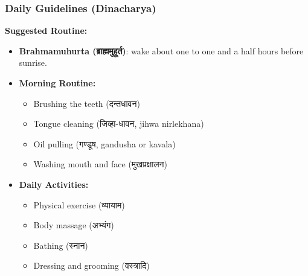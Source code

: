 \begin{frame}[fragile]\frametitle{Daily Guidelines (Dinacharya)}
    \textbf{Suggested Routine:}
    \begin{itemize}
        \item \textbf{Brahmamuhurta (ब्राह्ममुहूर्त)}: wake about one to one and a half hours before sunrise.
        \item \textbf{Morning Routine:}
        \begin{itemize}
            \item Brushing the teeth (दन्तधावन)
            \item Tongue cleaning (जिव्हा-धावन, jihwa nirlekhana)
            \item Oil pulling (गण्डूष, gandusha or kavala)
            \item Washing mouth and face (मुखप्रक्षालन)
        \end{itemize}
        \item \textbf{Daily Activities:}
        \begin{itemize}
            \item Physical exercise (व्यायाम)
            \item Body massage (अभ्यंग)
            \item Bathing (स्नान)
            \item Dressing and grooming (वस्त्रादि)
        \end{itemize}
    \end{itemize}
\end{frame}

